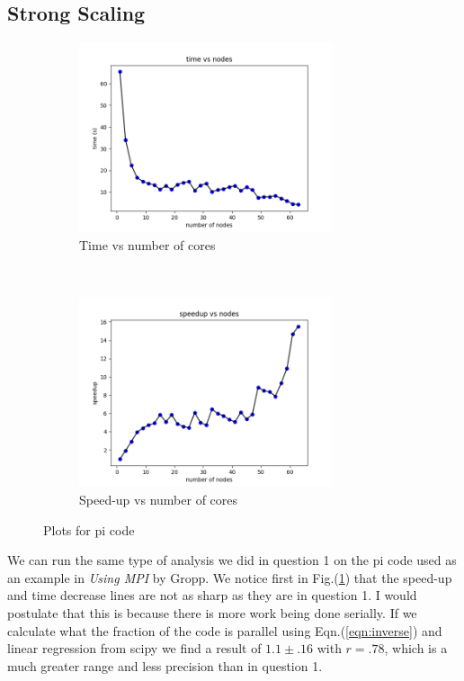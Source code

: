 \documentclass[12pt]{article}
\theoremstyle{plain}
\theoremstyle{definition}
\begin{document}
\subsection{Strong Scaling}
\begin{figure}[t]
    \centering
    \begin{subfigure}[t]{0.5\textwidth}
        \centering
        \includegraphics[height=2.2in]{timeq2_strong.png}
         \caption{Time vs number of cores}
    \end{subfigure}%
    ~
    \begin{subfigure}[t]{0.5\textwidth}
        \centering
        \includegraphics[height=2.2in]{speedupq2_strong.png}
        \caption{Speed-up vs number of cores}
    \end{subfigure}
    \caption{Plots for pi code}
    \label{fig:q2a}
\end{figure}

We can run the same type of analysis we did in question 1 on the pi code used as an example in \textit{Using MPI} by Gropp. We notice first in Fig.(\ref{fig:q2a}) that the speed-up and time decrease lines are not as sharp as they are in question 1. I would postulate that this is because there is more work being done serially. If we calculate what the fraction of the code is parallel using Eqn.(\ref{eqn:inverse}) and linear regression from scipy we find a result of $1.1 \pm .16$ with $r=.78$, which is a much greater range and less precision than in question 1.   
\end{document}
